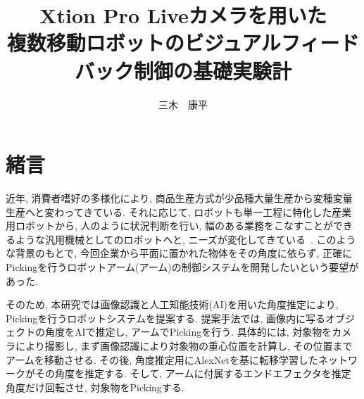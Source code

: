 \documentclass{suribt}
\title{\huge Xtion Pro Liveカメラを用いた\\複数移動ロボットのビジュアルフィードバック制御の基礎実験計}
\author{三木　康平}
\begin{document}
\maketitle %
\frontmatter %
\begin{abstract}%




\end{abstract}
\tableofcontents%
\mainmatter%
\chapter{緒言}
近年, 消費者嗜好の多様化により, 商品生産方式が少品種大量生産から変種変量生産へと変わってきている. それに応じて, ロボットも単一工程に特化した産業用ロボットから, 人のように状況判断を行い, 幅のある業務をこなすことができるような汎用機械としてのロボットへと, ニーズが変化してきている~\cite{Iziri-2019}. このような背景のもとで, 今回企業から平面に置かれた物体をその角度に依らず, 正確にPickingを行うロボットアーム(アーム)の制御システムを開発したいという要望があった. 

そのため, 本研究では画像認識と人工知能技術(AI)を用いた角度推定により, Pickingを行うロボットシステムを提案する. 提案手法では, 画像内に写るオブジェクトの角度をAIで推定し, アームでPickingを行う. 具体的には, 対象物をカメラにより撮影し, まず画像認識により対象物の重心位置を計算し, その位置までアームを移動させる. その後, 角度推定用にAlexNetを基に転移学習したネットワークがその角度を推定する. そして, アームに付属するエンドエフェクタを推定角度だけ回転させ, 対象物をPickingする. 

\end{document}
